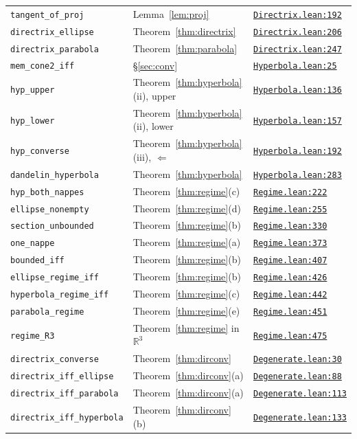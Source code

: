 \documentclass[11pt]{article}
\theoremstyle{remark}
\newcommand{\lean}[1]{\texttt{#1}}
\newcommand{\R}{\mathbb{R}}
\newcommand{\repoD}{https://github.com/jpbald93/dandelin}
\newcommand{\commitD}{205e4807a71d05898967d870e4528fb97d78b26d}
\newcommand{\srcD}[2]{\href{\repoD/blob/\commitD/Dandelin/#1\#L#2}{\texttt{#1:#2}}}
\begin{document}
\begin{longtable}{@{}p{}p{}l@{}}
\lean{tangent\_of\_proj} & Lemma~\ref{lem:proj} & \srcD{Directrix.lean}{192} \\
\lean{directrix\_ellipse} & Theorem~\ref{thm:directrix} & \srcD{Directrix.lean}{206} \\
\lean{directrix\_parabola} & Theorem~\ref{thm:parabola} & \srcD{Directrix.lean}{247} \\
\lean{mem\_cone2\_iff} & \S\ref{sec:conv} & \srcD{Hyperbola.lean}{25} \\
\lean{hyp\_upper} & Theorem~\ref{thm:hyperbola}(ii), upper & \srcD{Hyperbola.lean}{136} \\
\lean{hyp\_lower} & Theorem~\ref{thm:hyperbola}(ii), lower & \srcD{Hyperbola.lean}{157} \\
\lean{hyp\_converse} & Theorem~\ref{thm:hyperbola}(iii), $\Leftarrow$ & \srcD{Hyperbola.lean}{192} \\
\lean{dandelin\_hyperbola} & Theorem~\ref{thm:hyperbola} & \srcD{Hyperbola.lean}{283} \\
\lean{hyp\_both\_nappes} & Theorem~\ref{thm:regime}(c) & \srcD{Regime.lean}{222} \\
\lean{ellipse\_nonempty} & Theorem~\ref{thm:regime}(d) & \srcD{Regime.lean}{255} \\
\lean{section\_unbounded} & Theorem~\ref{thm:regime}(b) & \srcD{Regime.lean}{330} \\
\lean{one\_nappe} & Theorem~\ref{thm:regime}(a) & \srcD{Regime.lean}{373} \\
\lean{bounded\_iff} & Theorem~\ref{thm:regime}(b) & \srcD{Regime.lean}{407} \\
\lean{ellipse\_regime\_iff} & Theorem~\ref{thm:regime}(b) & \srcD{Regime.lean}{426} \\
\lean{hyperbola\_regime\_iff} & Theorem~\ref{thm:regime}(c) & \srcD{Regime.lean}{442} \\
\lean{parabola\_regime} & Theorem~\ref{thm:regime}(e) & \srcD{Regime.lean}{451} \\
\lean{regime\_R3} & Theorem~\ref{thm:regime} in $\R^3$ & \srcD{Regime.lean}{475} \\
\lean{directrix\_converse} & Theorem~\ref{thm:dirconv} & \srcD{Degenerate.lean}{30} \\
\lean{directrix\_iff\_ellipse} & Theorem~\ref{thm:dirconv}(a) & \srcD{Degenerate.lean}{88} \\
\lean{directrix\_iff\_parabola} & Theorem~\ref{thm:dirconv}(a) & \srcD{Degenerate.lean}{113} \\
\lean{directrix\_iff\_hyperbola} & Theorem~\ref{thm:dirconv}(b) & \srcD{Degenerate.lean}{133} \\

\end{longtable}
\end{document}
